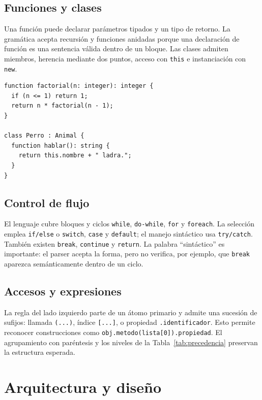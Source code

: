 \documentclass[12pt,letterpaper,oneside]{report}
\newcommand{\archivo}[1]{\texttt{#1}}
\begin{document}
\section{Funciones y clases}

Una función puede declarar parámetros tipados y un tipo de retorno. La gramática
acepta recursión y funciones anidadas porque una declaración de función es una
sentencia válida dentro de un bloque. Las clases admiten miembros, herencia mediante
dos puntos, acceso con \archivo{this} e instanciación con \archivo{new}.

\begin{verbatim}
function factorial(n: integer): integer {
  if (n <= 1) return 1;
  return n * factorial(n - 1);
}

class Perro : Animal {
  function hablar(): string {
    return this.nombre + " ladra.";
  }
}
\end{verbatim}

\section{Control de flujo}

El lenguaje cubre bloques y ciclos \archivo{while}, \archivo{do-while},
\archivo{for} y \archivo{foreach}. La selección emplea \archivo{if/else} o
\archivo{switch}, \archivo{case} y \archivo{default}; el manejo sintáctico usa
\archivo{try/catch}. También existen \archivo{break}, \archivo{continue} y
\archivo{return}. La palabra
``sintáctico'' es importante: el parser acepta la forma, pero no verifica, por
ejemplo, que \archivo{break} aparezca semánticamente dentro de un ciclo.

\section{Accesos y expresiones}

La regla del lado izquierdo parte de un átomo primario y admite una sucesión de
sufijos: llamada \archivo{(...)}, índice \archivo{[...]}, o propiedad
\archivo{.identificador}. Esto permite reconocer construcciones como
\archivo{obj.metodo(lista[0]).propiedad}. El agrupamiento con paréntesis y los niveles
de la Tabla~\ref{tab:precedencia} preservan la estructura esperada.

\chapter{Arquitectura y diseño}
\end{document}
